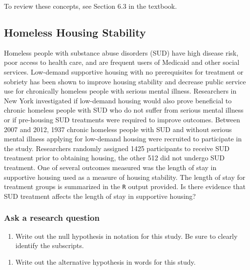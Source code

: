 \documentclass[
]{report}
\providecommand{\tightlist}{%
  \setlength{\itemsep}{0pt}\setlength{\parskip}{0pt}}
\begin{document}
To review these concepts, see Section 6.3 in the textbook.

\hypertarget{homeless-housing-stability}{%
\subsection{Homeless Housing Stability}\label{homeless-housing-stability}}

Homeless people with substance abuse disorders (SUD) have high disease risk, poor access to health care, and are frequent users of Medicaid and other social services. Low-demand supportive housing with no prerequisites for treatment or sobriety has been shown to improve housing stability and decrease public service use for chronically homeless people with serious mental illness. Researchers in New York investigated if low-demand housing would also prove beneficial to chronic homeless people with SUD who do not suffer from serious mental illness or if pre-housing SUD treatments were required to improve outcomes. Between 2007 and 2012, 1937 chronic homeless people with SUD and without serious mental illness applying for low-demand housing were recruited to participate in the study. Researchers randomly assigned 1425 participants to receive SUD treatment prior to obtaining housing, the other 512 did not undergo SUD treatment. One of several outcomes measured was the length of stay in supportive housing used as a measure of housing stability. The length of stay for treatment groups is summarized in the \texttt{R} output provided. Is there evidence that SUD treatment affects the length of stay in supportive housing?

\hypertarget{ask-a-research-question-5}{%
\subsubsection*{Ask a research question}\label{ask-a-research-question-5}}

\begin{enumerate}
\def\labelenumi{\arabic{enumi}.}
\tightlist
\item
  Write out the null hypothesis in notation for this study. Be sure to clearly identify the subscripts.
\end{enumerate}

\vspace{0.5in}

\begin{enumerate}
\def\labelenumi{\arabic{enumi}.}
\setcounter{enumi}{1}
\tightlist
\item
  Write out the alternative hypothesis in words for this study.
\end{enumerate}
\end{document}
